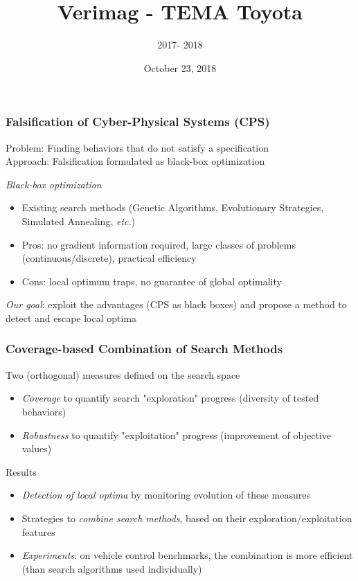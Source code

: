 %



\title{Verimag - TEMA Toyota}
\subtitle{ 2017- 2018}
\date{October 23, 2018}
\author{}
\institute{}



\maketitle

    


\begin{frame}
\frametitle{Falsification of Cyber-Physical Systems (CPS) }
\alert{Problem}: Finding behaviors that do not satisfy a specification\\ 
\alert{Approach}: Falsification formulated as black-box optimization  

{\em Black-box optimization}
\begin{itemize} 
\item Existing search methods (Genetic Algorithms, Evolutionary Strategies, Simulated Annealing, {\em etc.})
\item Pros: no gradient information required, large classes of problems (continuous/discrete), practical efficiency
\item Cons: local optimum traps, no guarantee of global optimality
\end{itemize}
{\em Our goal}: exploit the advantages (CPS as black boxes) and propose a method to detect and escape local optima 
\end{frame}


\begin{frame}
\frametitle{Coverage-based Combination of Search Methods}
{\fontsize{12pt}{12pt}\selectfont
Two (orthogonal) measures defined on the search space
\begin{itemize}
\item {\em Coverage} to quantify search "exploration" progress (diversity of tested behaviors)  
\item {\em Robustness} to quantify "exploitation" progress (improvement of objective values)
\end{itemize} 
\alert{Results} 
\begin{itemize}
\item {\em Detection of local optima} by monitoring evolution of these measures
\item Strategies to {\em combine search methods}, based on their exploration/exploitation features
\item {\em Experiments}:  on vehicle control benchmarks, the combination is more efficient (than search algorithms used individually)
\end{itemize}
}
\end{frame}

